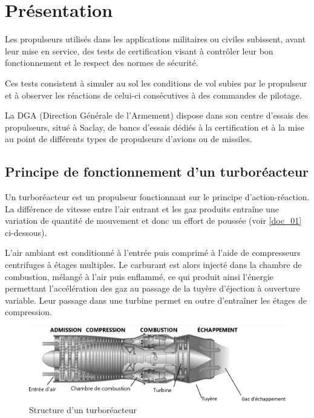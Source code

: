 \documentclass[10pt,fleqn]{article} %
\begin{document}

\vspace{4cm}
\pagestyle{fancy}
\thispagestyle{plain}

\def\columnseprulecolor{\color{ocre}}




\section{Présentation}
\begin{multicols}{2}
Les propulseurs utilisés dans les applications militaires ou civiles subissent, avant leur mise en service, des tests de certification visant à contrôler leur bon fonctionnement et le respect des normes de sécurité.

Ces tests consistent à simuler au sol les conditions de vol subies par le propulseur et à observer les réactions de celui-ci consécutives à des commandes de pilotage.
	
La DGA (Direction Générale de l'Armement) dispose dans son centre d'essais des propulseurs, situé à Saclay, de bancs d'essais dédiés à la certification et à la mise au point de différents types de propulseurs d'avions ou de missiles. 

\subsection{Principe de fonctionnement d'un turboréacteur}
Un turboréacteur est un propulseur fonctionnant sur le principe d'action-réaction. La différence de vitesse entre l'air entrant et les gaz produits entraîne une variation de quantité de mouvement et donc un effort de poussée (voir \autoref{doc_01}  ci-dessous). 

L'air ambiant est conditionné à l'entrée puis comprimé à l'aide de compresseurs centrifuges à étages multiples. Le carburant est alors injecté dans la chambre de combustion, mélangé à l'air puis enflammé, ce qui produit ainsi l'énergie permettant l'accélération des gaz au passage de la tuyère d'éjection à ouverture variable. Leur passage dans une turbine permet en outre d'entraîner les étages de compression.

\begin{figure}[H]
\centering
\includegraphics[width=.9\linewidth]{doc_01}
\caption{\label{doc_01} Structure d'un turboréacteur}
\end{figure}


\end{multicols}
\end{document}
